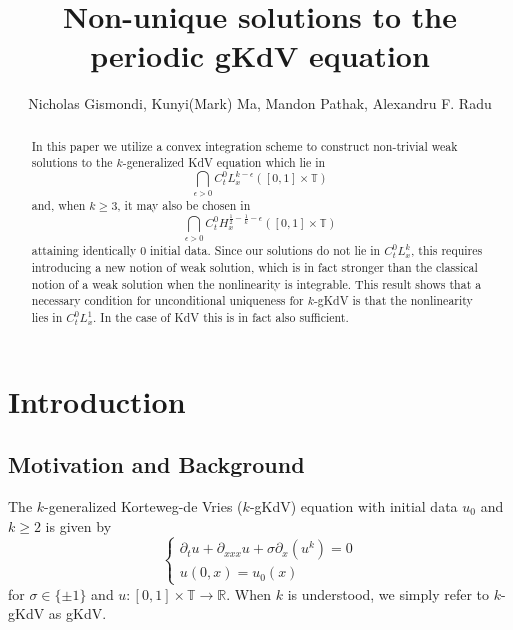 \documentclass[12pt,reqno,letterpaper]{amsart}
\numberwithin{equation}{section}
\newcommand{\1}{{\bf 1}}
\newcommand{\2}{{\bf 2}}
\newcommand{\R}{\mathbb R}
\newcommand{\T}{\mathbb T}
\theoremstyle{remark}
\theoremstyle{remark}
\begin{document}
\author{Nicholas Gismondi, Kunyi(Mark) Ma, Mandon Pathak, Alexandru F. Radu}

\title{Non-unique solutions to the periodic \textsf{gKdV} equation}

\begin{abstract}
    In this paper we utilize a convex integration scheme to construct non-trivial weak solutions to the $k$-generalized \textsf{KdV} equation which lie in
    $$
    \bigcap_{\epsilon > 0} C_t^0 L_x^{k-\epsilon}([0,1] \times \T)
    $$
    and, when $k \ge 3$, it may also be chosen in
    \[
    \bigcap_{\epsilon >0} C_t^0 H_x^{\frac{1}{2} - \frac{1}{k} - \epsilon}([0,1] \times \T)
    \]
    attaining identically $0$ initial data. Since our solutions do not lie in $C_t^0 L_x^k$, this requires introducing a new notion of weak solution, which is in fact stronger than the classical notion of a weak solution when the nonlinearity is integrable. This result shows that a necessary condition for unconditional uniqueness for $k$-\textsf{gKdV} is that the nonlinearity lies in $C_t^0L^1_x$. In the case of \textsf{KdV} this is in fact also sufficient.
\end{abstract}
\maketitle


\section{Introduction}
\subsection{Motivation and Background}
The $k$-generalized Korteweg-de Vries ($k$-\textsf{gKdV}) equation with initial data $u_0$ and $k \geq 2$ is given by
\begin{equation}\label{eq:gkdv}
\begin{cases}
    \partial_t u + \partial_{xxx} u + \sigma\partial_x\left(u^k\right)= 0\\
    u(0,x) = u_0(x)
\end{cases}
\end{equation}
for $\sigma \in \{\pm 1\}$ and $u:[0,1] \times \T \to \R$. When $k$ is understood, we simply refer to $k$-\textsf{gKdV} as \textsf{gKdV}.
\end{document}

